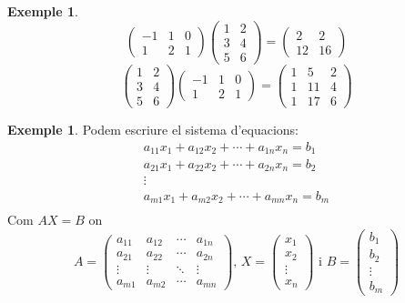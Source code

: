 \documentclass[a4paper,12pt,twoside]{article}
\newcommand{\1}{\mathbf{1}}
\newcommand{\0}{\mathbf{0}}
\theoremstyle{definition}
\newtheorem{exemple}[teorema]{Exemple}
\theoremstyle{remark}
\begin{document}
\begin{exemple}\label{exempl:prodmat}
	$$
	\begin{pmatrix} -1 & 1 & 0 \\ 1 & 2 & 1 \end{pmatrix}
	\begin{pmatrix} 1 & 2 \\ 3 & 4 \\ 5 & 6 \end{pmatrix}
	= 	\begin{pmatrix} 2 & 2 \\ 12 & 16 \end{pmatrix}
	$$
	$$
	\begin{pmatrix} 1 & 2 \\ 3 & 4 \\ 5 & 6 \end{pmatrix}
	\begin{pmatrix} -1 & 1 & 0 \\ 1 & 2 & 1 \end{pmatrix}
	= 	\begin{pmatrix} 1 & 5 & 2 \\ 1 & 11 & 4 \\ 1 & 17 & 6 \end{pmatrix}
	$$
\end{exemple}

\begin{exemple}
	Podem escriure el sistema d'equacions:
	$$
	\begin{matrix}
	a_{11}x_1+a_{12}x_2+ \cdots + a_{1n}x_n = b_1 \\
	a_{21}x_1+a_{22}x_2+ \cdots + a_{2n}x_n = b_2 \\
	\vdots \\
	a_{m1}x_1+a_{m2}x_2+ \cdots + a_{mn}x_n = b_m \\
	\end{matrix}
	$$
	Com $AX=B$ on
	$$A=
	\left(\begin{array}{cccc}
	a_{11} & a_{12} & \cdots & a_{1n} \\
	a_{21} & a_{22} & \cdots & a_{2n} \\
	\vdots & \vdots & \ddots & \vdots \\
	a_{m1} & a_{m2} & \cdots & a_{mn} 
	\end{array}\right)\text{, }
	X=
	\begin{pmatrix}
	x_1 \\ x_2 \\ \vdots \\ x_n
	\end{pmatrix} \text{ i }
		B=
	\begin{pmatrix}
	b_1 \\ b_2 \\ \vdots \\ b_m
	\end{pmatrix}
	$$
\end{exemple}
\end{document}
